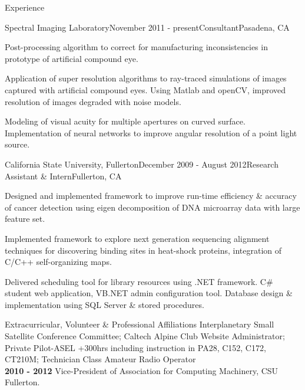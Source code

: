 \documentclass{resume} %
\begin{document}
\begin{rSection}{Experience}

\begin{rSubsection}{Spectral Imaging Laboratory}{November 2011 - present}{Consultant}{Pasadena, CA}
\item Post-processing algorithm to correct for manufacturing inconsistencies in prototype of artificial compound eye.
\item Application of super resolution algorithms to ray-traced simulations of images captured with artificial compound eyes. Using Matlab and openCV, improved resolution of images degraded with noise models.
\item Modeling of visual acuity for multiple apertures on curved surface. Implementation of neural networks to improve angular resolution of a point light source. 
\end{rSubsection}




\begin{rSubsection}{California State University, Fullerton}{December 2009 - August 2012}{Research Assistant \& Intern}{Fullerton, CA}
\item Designed and implemented framework to improve run-time efficiency \& accuracy of cancer detection using eigen decomposition of DNA microarray data with large feature set.
\item Implemented framework to explore next generation sequencing alignment techniques for discovering binding sites in heat-shock proteins, integration of C/C++ self-organizing maps.
\item Delivered scheduling tool for library resources using .NET framework. C\# student web application, VB.NET admin configuration tool. Database design \& implementation using SQL Server \& stored procedures.
\end{rSubsection}
\end{rSection}


\begin{rSection}{ Extracurricular, Volunteer \& Professional Affiliations}
{\bf } Interplanetary Small Satellite Conference Committee; Caltech Alpine Club Website Administrator; Private Pilot-ASEL +300hrs including instruction in PA28, C152, C172, CT210M; Technician Class Amateur Radio Operator \\
{\bf 2010 - 2012} Vice-President of Association for Computing Machinery, CSU Fullerton. 
\end{rSection}
\end{document}
